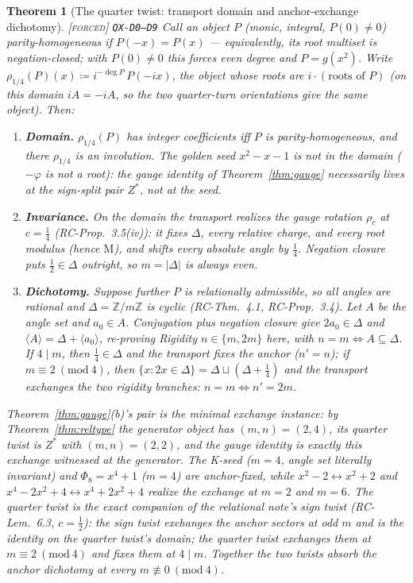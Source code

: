 \documentclass[11pt]{article}
\newcommand{\tagF}{\textcolor{cF}{\textsc{[forced]}}}
\newcommand{\hx}[1]{\textcolor{cC}{\footnotesize\texttt{#1}}}
\newcommand{\Z}{\mathbb{Z}}
\newcommand{\gp}{\varphi}
\newcommand{\M}{\mathrm{M}}
\theoremstyle{plain}
\newtheorem{theorem}{Theorem}[section]
\theoremstyle{definition}
\theoremstyle{remark}
\begin{document}
\begin{theorem}[The quarter twist: transport domain and anchor-exchange dichotomy]\label{thm:quartertwist}\tagF{} \hx{QX-D0--D9}
Call an object $P$ (monic, integral, $P(0)\ne0$) \emph{parity-homogeneous}
if $P(-x)=P(x)$ --- equivalently, its root multiset is negation-closed;
with $P(0)\ne0$ this forces even degree and $P=g(x^2)$. Write
$\rho_{1/4}(P)(x)\coloneqq i^{-\deg P}\,P(-ix)$, the object whose roots are
$i\cdot(\text{roots of }P)$ (on this domain $iA=-iA$, so the two
quarter-turn orientations give the same object). Then:
\begin{enumerate}[nosep,label=(\alph*)]
\item \textbf{Domain.} $\rho_{1/4}(P)$ has integer coefficients iff $P$ is
parity-homogeneous, and there $\rho_{1/4}$ is an involution. The golden
seed $x^2-x-1$ is \emph{not} in the domain ($-\gp$ is not a root): the
gauge identity of Theorem~\ref{thm:gauge} necessarily lives at the
sign-split pair $Z^{*}$, not at the seed.
\item \textbf{Invariance.} On the domain the transport realizes the gauge
rotation $\rho_c$ at $c=\tfrac14$ (RC-Prop.\ 3.5(iv)): it fixes $\Delta$,
every relative charge, and every root modulus (hence $\M$), and shifts
every absolute angle by $\tfrac14$. Negation closure puts
$\tfrac12\in\Delta$ outright, so $m=|\Delta|$ is always even.
\item \textbf{Dichotomy.} Suppose further $P$ is relationally admissible,
so all angles are rational and $\Delta=\Z/m\Z$ is cyclic (RC-Thm.\ 4.1,
RC-Prop.\ 3.4). Let $A$ be the angle set and $a_0\in A$. Conjugation plus
negation closure give $2a_0\in\Delta$ and
$\langle A\rangle=\Delta+\langle a_0\rangle$, re-proving Rigidity
$n\in\{m,2m\}$ here, with $n=m\iff A\subseteq\Delta$. If $4\mid m$, then
$\tfrac14\in\Delta$ and the transport \emph{fixes} the anchor ($n'=n$); if
$m\equiv2\ (\mathrm{mod}\ 4)$, then
$\{x:2x\in\Delta\}=\Delta\sqcup(\Delta+\tfrac14)$ and the transport
\emph{exchanges} the two rigidity branches: $n=m\iff n'=2m$.
\end{enumerate}
Theorem~\ref{thm:gauge}(b)'s pair is the minimal exchange instance: by
Theorem~\ref{thm:reltype} the generator object has $(m,n)=(2,4)$, its
quarter twist is $Z^{*}$ with $(m,n)=(2,2)$, and the gauge identity is
exactly this exchange witnessed at the generator. The K-seed ($m=4$, angle
set literally invariant) and $\Phi_8=x^4+1$ ($m=4$) are anchor-fixed,
while $x^2-2\leftrightarrow x^2+2$ and
$x^4-2x^2+4\leftrightarrow x^4+2x^2+4$ realize the exchange at $m=2$ and
$m=6$. The quarter twist is the exact companion of the relational note's
sign twist (RC-Lem.\ 6.3, $c=\tfrac12$): the sign twist exchanges the
anchor sectors at \emph{odd} $m$ and is the identity on the quarter
twist's domain; the quarter twist exchanges them at
$m\equiv2\ (\mathrm{mod}\ 4)$ and fixes them at $4\mid m$. Together the
two twists absorb the anchor dichotomy at every
$m\not\equiv0\ (\mathrm{mod}\ 4)$.
\end{theorem}
\end{document}
